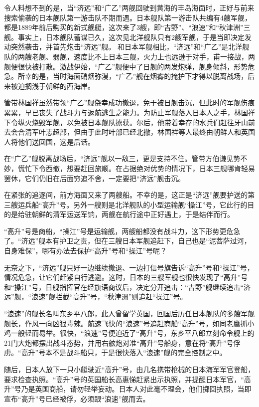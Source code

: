 \documentclass[12pt,UTF8]{ctexbook}
\begin{document}
令人料想不到的是，当“济远”和“广乙”两舰回驶到黄海的丰岛海面时，正好与前来搜索偷袭的日本舰队第一游击队不期而遇。日本舰队第一游击队共编有4艘军舰，都是1889年前后购买的新式舰艇，这次来了3艘，即“吉野”、“浪速”和“秋津洲”三舰。事实上，日本舰队蓄谋已久，这次见北洋舰队只有2艘军舰，于是当即决定发动突然袭击，并首先炮击“济远”舰。
和日本军舰相比，“济远”和“广乙”是北洋舰队的两艘老舰、弱舰，速度比不上日本三舰，火力上也远逊于对手，甫一接战，两舰便很快被打散。激战伊始，“广乙”舰便中了日舰的两发炮弹，舰身倾斜，形势危急。所幸的是，当时海面硝烟弥漫，“广乙”舰在烟雾的掩护下才得以脱离战场，后来被迫搁浅于朝鲜的西海岸。

管带林国祥虽然带领“广乙”舰侥幸成功撤退，免于被日舰击沉，但此时的军舰伤痕累累，早已丧失了战斗力与返航逃生之能力。为防止军舰落入日本人之手，林国祥下令纵火烧毁军舰，以免被日本舰队掳获。尔后，他带着幸存的水兵们赶往牙山前去会合清军叶志超部，但由于此时叶部已经北撤，林国祥等人最终由朝鲜人和英国人将他们送回国，这是后话。

在“广乙”舰脱离战场后，“济远”舰以一敌三，更是支持不住。管带方伯谦见势不妙，慌忙下令西撤，想要赶回旅顺。在占据绝对优势的情况下，日本三舰哪肯轻易罢休，它们仍旧在后面穷追不舍，一定要把“济远”舰击沉。

在紧张的追逐间，前方海面又来了两艘船。不幸的是，这正是“济远”舰要护送的第三艘运兵船“高升”号。另外一艘则是北洋舰队的小型运输舰“操江”号，它此行的目的是给驻朝鲜的清军运送军饷，两舰在航行途中正好遇上，于是结伴而行。

“高升”号是商船，“操江”号是运输舰，两艘船都没有战斗力，这下形势更危急了。“济远”舰本有护卫之责，但在三艘日本军舰追赶下，自己也是“泥菩萨过河，自身难保”，哪有办法去保护“高升”号和“操江”号呢？

无奈之下，“济远”舰只好一边继续撤退、一边打信号旗告诉“高升”号和“操江”号，情况危急，让它们赶紧自行逃避。这时，日本的三艘军舰也很快发现了“高升”号和“操江”号，日舰指挥官在经旗语商议后，决定分开追击：“吉野”舰继续追击“济远”舰，“浪速”舰拦截“高升”号，“秋津洲”则追赶“操江”号。

“浪速”的舰长名叫东乡平八郎，此人曾留学英国，回国后历任日本舰队的多艘军舰舰长，作风一向凶狠毒辣。航速飞快的“浪速”号追赶商船“高升”号，如同老鹰抓小鸡一般轻而易举。很快，“浪速”号便迫近了“高升”号，东乡平八郎立刻命令舰上的21门大炮都摆出战斗态势，并用右舷炮对准“高升”号船身，意在将“高升”号俘虏。“高升”号本不是战斗船只，于是很快落入“浪速”舰的完全控制之中。

随后，日本人放下一只小艇驶近“高升”号，由几名携带枪械的日本海军军官登船，要求检查执照。“高升”号的英国船长高惠悌赶紧出示执照，并提醒日本军官，“高升”号乃是英国商船，请勿轻举妄动。日本人对此毫不理会，他们掷回执照，当即宣布“高升”号已经被俘，必须跟“浪速”舰而去。
\end{document}
